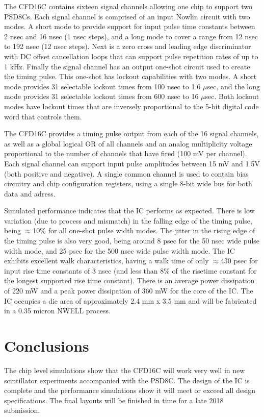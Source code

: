 \documentclass[12pt,oneside,final]{siuethesis}
\theoremstyle{definition}
\begin{document}
\par The CFD16C contains sixteen signal channels allowing one chip to support two PSD8Cs. Each signal channel is comprised of an input Nowlin circuit with two modes. A short mode to provide support for input pulse time constants between 2 nsec and 16 nsec (1 nsec steps), and a long mode to cover a range from 12 nsec to 192 nsec (12 nsec steps). Next is a zero cross and leading edge discriminator with DC offset cancellation loops that can support pulse repetition rates of up to 1 kHz. Finally the signal channel has an output one-shot circuit used to create the timing pulse. This one-shot has lockout capabilities with two modes. A short mode provides 31 selectable lockout times from 100 nsec to 1.6 $\mu$sec, and the long mode provides 31 selectable lockout times from 600 nsec to 16 $\mu$sec. Both lockout modes have lockout times that are inversely proportional to the 5-bit digital code word that controls them. 
\par The CFD16C provides a timing pulse output from each of the 16 signal channels, as well as a global logical OR of all channels and an analog multiplicity voltage proportional to the number of channels that have fired (100 mV per channel). Each signal channel can support input pulse amplitudes between 15 mV and 1.5V (both positive and negative). A single common channel is used to contain bias circuitry and chip configuration registers, using a single 8-bit wide bus for both data and adress. 
\par Simulated performance indicates that the IC performs as expected. There is low variation (due to process and mismatch) in the falling edge of the timing pulse, being $\approx$10\% for all one-shot pulse width modes. The jitter in the rising edge of the timing pulse is also very good, being around 8 psec for the 50 nsec wide pulse width mode, and 25 psec for the 500 nsec wide pulse width mode. The IC exhibits excellent walk characteristics, having a walk time of only $\approx$430 psec for input rise time constants of 3 nsec (and less than 8\% of the risetime constant for the longest supported rise time constant). There is an average power dissipation of 220 mW and a peak power dissipation of 360 mW for the core of the IC. The IC occupies a die area of approximately 2.4 mm x 3.5 mm and will be fabricated in a 0.35 micron NWELL process.
\section{Conclusions}
\par The chip level simulations show that the CFD16C will work very well in new scintillator experiments accompanied with the PSD8C. The design of the IC is complete and the performance simulations show it will meet or exceed all design specifications. The final layouts will be finished in time for a late 2018 submission.
\end{document}
